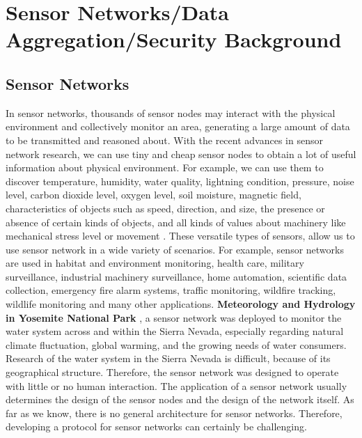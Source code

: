 \chapter{Sensor Networks/Data Aggregation/Security Background} 
\label{cha:Sensor Networks/Data Aggregation/Security Background}

\section{Sensor Networks}
	In sensor networks, thousands of sensor nodes may interact with the physical environment and collectively monitor an area, generating a large amount of data to be transmitted and reasoned about.
	With the recent advances in sensor network research, we can use tiny and cheap sensor nodes to obtain a lot of useful information about physical environment.
	For example, we can use them to discover temperature, humidity, water quality, lightning condition, pressure, noise level, carbon dioxide level, oxygen level, soil moisture, magnetic field, characteristics of objects such as speed, direction, and size, the presence or absence of certain kinds of objects, and all kinds of values about machinery like mechanical stress level or movement \cite{hof2007applications}.
	These versatile types of sensors, allow us to use sensor network in a wide variety of scenarios.
	For example, sensor networks are used in habitat and environment monitoring, health care, military surveillance, industrial machinery surveillance, home automation, scientific data collection, emergency fire alarm systems, traffic monitoring, wildfire tracking, wildlife monitoring and many other applications.
	\textbf{Meteorology and Hydrology in Yosemite National Park} \cite{lundquist2003meteorology}, a sensor network was deployed to monitor the water system across and within the Sierra Nevada, especially regarding natural climate fluctuation, global warming, and the growing needs of water consumers.
	Research of the water system in the Sierra Nevada is difficult, because of its geographical structure. 
	Therefore, the sensor network was designed to operate with little or no human interaction.
	The application of a sensor network usually determines the design of the sensor nodes and the design of the network itself.
	As far as we know, there is no general architecture for sensor networks.
	Therefore, developing a protocol for sensor networks can certainly be challenging. 

